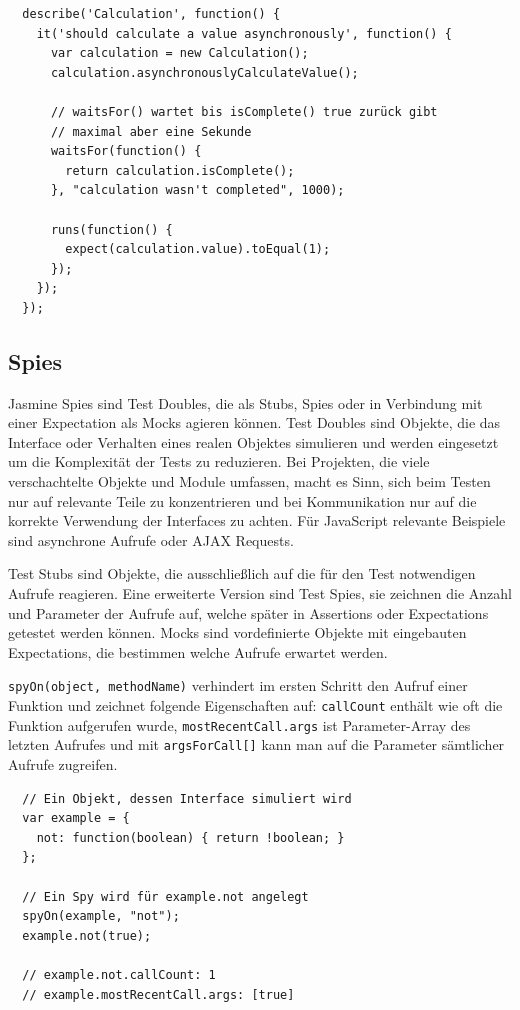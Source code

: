 \documentclass[11pt, a4paper]{article}
\begin{document}
\begin{verbatim}
  describe('Calculation', function() {
    it('should calculate a value asynchronously', function() {
      var calculation = new Calculation();
      calculation.asynchronouslyCalculateValue();

      // waitsFor() wartet bis isComplete() true zurück gibt
      // maximal aber eine Sekunde
      waitsFor(function() {
        return calculation.isComplete();
      }, "calculation wasn't completed", 1000);

      runs(function() {
        expect(calculation.value).toEqual(1);
      });
    });
  });
\end{verbatim}

\subsection{Spies}

Jasmine Spies sind Test Doubles\cite{meszaros_test_2011-1}, die als Stubs,
Spies oder in Verbindung mit einer Expectation als Mocks agieren können.
Test Doubles sind Objekte, die das Interface oder Verhalten eines realen
Objektes simulieren und werden eingesetzt um die Komplexität der Tests zu
reduzieren. Bei Projekten, die viele verschachtelte Objekte und Module umfassen,
macht es Sinn, sich beim Testen nur auf relevante Teile zu konzentrieren und bei
Kommunikation nur auf die korrekte Verwendung der Interfaces zu achten. Für
JavaScript relevante Beispiele sind asynchrone Aufrufe oder AJAX Requests.

Test Stubs sind Objekte, die ausschließlich auf die für den Test notwendigen
Aufrufe reagieren. Eine erweiterte Version sind Test Spies, sie zeichnen die
Anzahl und Parameter der Aufrufe auf, welche später in Assertions oder
Expectations getestet werden können. Mocks sind vordefinierte Objekte mit
eingebauten Expectations, die bestimmen welche Aufrufe erwartet werden.

\texttt{spyOn(object, methodName)} verhindert im ersten Schritt den Aufruf einer
Funktion und zeichnet folgende Eigenschaften auf: \texttt{callCount} enthält wie
oft die Funktion aufgerufen wurde, \texttt{mostRecentCall.args} ist
Parameter-Array des letzten Aufrufes und mit \texttt{argsForCall[]} kann man auf
die Parameter sämtlicher Aufrufe zugreifen.

\begin{verbatim}
  // Ein Objekt, dessen Interface simuliert wird
  var example = {
    not: function(boolean) { return !boolean; }
  };

  // Ein Spy wird für example.not angelegt
  spyOn(example, "not");
  example.not(true);

  // example.not.callCount: 1
  // example.mostRecentCall.args: [true]
\end{verbatim}
\end{document}
